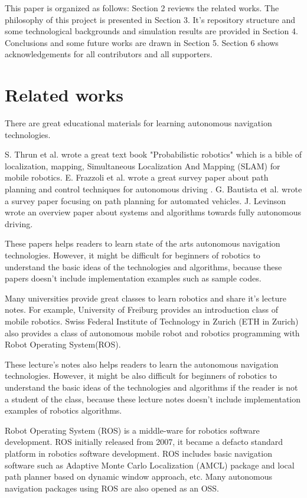 \documentclass{bmvc2k}
\begin{document}
This paper is organized as follows: Section 2 reviews the related works. The philosophy of this project is presented in Section 3. It's repository structure and some technological backgrounds and simulation results are provided in Section 4. Conclusions and some future works are drawn in Section 5. 
Section 6 shows acknowledgements for all contributors and all supporters. 


\section{Related works}

There are great educational materials for learning autonomous navigation technologies.

S. Thrun et al. wrote a great text book "Probabilistic robotics" which is a bible of localization, mapping, Simultaneous Localization And Mapping (SLAM) for mobile robotics\cite{PR}.
E. Frazzoli et al. wrote a great survey paper about path planning and control techniques for autonomous driving \cite{pathtracking}.
G. Bautista et al. wrote a survey paper focusing on path planning for automated vehicles\cite{pathplanning}.
J. Levinson wrote an overview paper about systems and algorithms towards fully autonomous driving\cite{Levinson2011}.

These papers helps readers to learn state of the arts autonomous navigation technologies.
However, it might be difficult for beginners of robotics to understand the basic ideas of the technologies and algorithms, because these papers doesn't include implementation examples such as sample codes.

Many universities provide great classes to learn robotics and share it's lecture notes.
For example, University of Freiburg provides an introduction class of mobile robotics\cite{course1}.
Swiss Federal Institute of Technology in Zurich (ETH in Zurich) also provides a class of autonomous mobile robot\cite{course2} and robotics programming with Robot Operating System(ROS)\cite{course3}.

These lecture's notes also helps readers to learn the autonomous navigation technologies.
However, it might be also difficult for beginners of robotics to understand the basic ideas of the technologies and algorithms if the reader is not a student of the class, because these lecture notes doesn't include implementation examples of robotics algorithms.

Robot Operating System (ROS) is a middle-ware for robotics software development\cite{ros}\cite{rospaper}.
ROS initially released from 2007, it became a defacto standard platform in robotics software development.
ROS includes basic navigation software such as Adaptive Monte Carlo Localization (AMCL) package and local path planner based on dynamic window approach, etc\cite{rosnavigation}.
Many autonomous navigation packages using ROS are also opened as an OSS.
\end{document}
